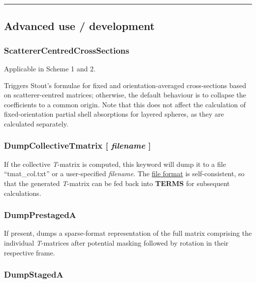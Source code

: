 \documentclass[
]{article}
\begin{document}
\begin{center}\rule{0.5\linewidth}{0.5pt}\end{center}

\hypertarget{advanced-use-development}{%
\subsection{Advanced use / development}\label{advanced-use-development}}

\hypertarget{scatterercentredcrosssections}{%
\subsubsection{ScattererCentredCrossSections}\label{scatterercentredcrosssections}}

Applicable in Scheme 1 and 2.

Triggers Stout's formulae for fixed and orientation-averaged
cross-sections based on scatterer-centred matrices; otherwise, the
default behaviour is to collapse the coefficients to a common origin.
Note that this does not affect the calculation of fixed-orientation
partial shell absorptions for layered spheres, as they are calculated
separately.

\hypertarget{dumpcollectivetmatrix-filename}{%
\subsubsection{\texorpdfstring{DumpCollectiveTmatrix {[} \emph{filename}
{]}}{DumpCollectiveTmatrix {[} filename {]}}}\label{dumpcollectivetmatrix-filename}}

If the collective \emph{T}-matrix is computed, this keyword will dump it
to a file ``tmat\_col.txt'' or a user-specified \emph{filename}. The
\protect\hyperlink{tmatrixfiles-nfiles-1}{file format} is
self-consistent, so that the generated \emph{T}-matrix can be fed back
into \textbf{TERMS} for subsequent calculations.

\hypertarget{dumpprestageda}{%
\subsubsection{DumpPrestagedA}\label{dumpprestageda}}

If present, dumps a sparse-format representation of the full matrix
comprising the individual \emph{T}-matrices after potential masking
followed by rotation in their respective frame.

\hypertarget{dumpstageda}{%
\subsubsection{DumpStagedA}\label{dumpstageda}}
\end{document}
